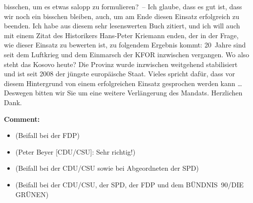 \documentclass{article}
\begin{document}
bisschen, um es etwas salopp zu formulieren? – Ich glaube, dass es gut ist, dass wir noch ein bisschen bleiben,  auch, um am Ende diesen Einsatz erfolgreich zu beenden. Ich habe aus diesem sehr lesenswerten Buch zitiert, und ich will auch mit einem Zitat des Historikers Hans-Peter Kriemann enden, der in der Frage, wie dieser Einsatz zu bewerten ist, zu folgendem Ergebnis kommt: 20 Jahre sind seit dem Luftkrieg und dem Einmarsch der KFOR inzwischen vergangen. Wo also steht das Kosovo heute? Die Provinz wurde inzwischen weitgehend stabilisiert und ist seit 2008 der jüngste europäische Staat. Vieles spricht dafür, dass vor diesem Hintergrund von einem erfolgreichen Einsatz gesprochen werden kann … Deswegen bitten wir Sie um eine weitere Verlängerung des Mandats. Herzlichen Dank.  

\noindent\textbf{Comment:}
\begin{itemize}
    \setlength\itemsep{-3pt}
    \item (Beifall bei der FDP)
    \setlength\itemsep{-3pt}
    \item (Peter Beyer [CDU/CSU]: Sehr richtig!)
    \setlength\itemsep{-3pt}
    \item (Beifall bei der CDU/CSU sowie bei Abgeordneten der SPD)
    \setlength\itemsep{-3pt}
    \item (Beifall bei der CDU/CSU, der SPD, der FDP und dem BÜNDNIS 90/DIE GRÜNEN)
\end{itemize}
\end{document}
